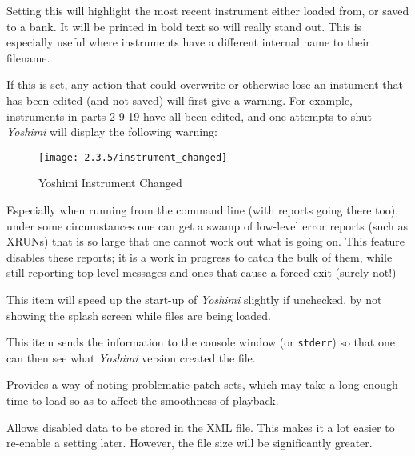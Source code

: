    \setcounter{ItemCounter}{0}      %
   Setting this will highlight the most recent instrument either loaded from, or saved to a bank. It will be printed in bold text so will really stand out. This is especially useful where instruments have a different internal name to their filename.

   If this is set, any action that could overwrite or otherwise lose an instument that has
   been edited (and not saved) will first give a warning. For example, instruments in parts
   2 9 19 have all been edited, and one attempts to shut \textsl{Yoshimi} will display the
   following warning:

   \begin{figure}[H]
   \centering
   \texttt{[image: 2.3.5/instrument\_changed]}
   \caption{Yoshimi Instrument Changed}
   \label{fig:yoshimi_instrument_changed}
\end{figure}

   Especially when running from the command line (with reports going there
   too), under some circumstances one can get a swamp of low-level error
   reports (such as XRUNs) that is so large that one cannot work out what is
   going on. This feature disables these reports; it is a work in
   progress to catch the bulk of them, while still reporting top-level messages
   and ones that cause a forced exit (surely not!)

   This item will speed up the start-up of \textsl{Yoshimi} slightly
   if unchecked, by not showing the splash screen while files are being loaded.

   This item sends the information to the console window
   (or \texttt{stderr}) so that
   one can then see what \textsl{Yoshimi}
   version created the file.

   Provides a way of noting problematic patch sets, which may take a long
   enough time to load so as to affect the smoothness of playback.

    Allows disabled data
   to be stored in the XML file. This makes it a lot easier to re-enable a setting
   later. However, the file size will be significantly greater.

